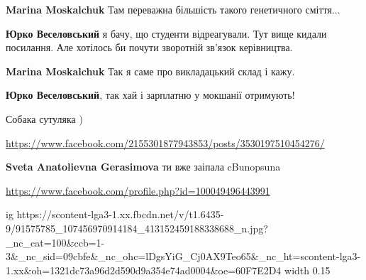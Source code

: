 \begin{itemize}

\textbf{Marina Moskalchuk} Там переважна більшість такого генетичного сміття...


\textbf{Юрко Веселовський} я бачу, що студенти відреагували. Тут вище кидали посилання.
Але хотілось би почути зворотній зв'язок керівництва.


\textbf{Marina Moskalchuk} Так я саме про викладацький склад і кажу.


\textbf{Юрко Веселовський}, так хай і зарплатню у мокшанії отримують!
\end{itemize}


Собака сутуляка )


\url{https://www.facebook.com/2155301877943853/posts/3530197510454276/}

\begin{itemize}

\textbf{Sveta Anatolievna Gerasimova} ти вже заіпала cBunopsuna
\end{itemize}

\url{https://www.facebook.com/profile.php?id=100049496443991}\par
\ifcmt
  ig https://scontent-lga3-1.xx.fbcdn.net/v/t1.6435-9/91575785_107456970914184_413152459188338688_n.jpg?_nc_cat=100&ccb=1-3&_nc_sid=09cbfe&_nc_ohc=lDgsYiG_Cj0AX9Teo65&_nc_ht=scontent-lga3-1.xx&oh=1321dc73a96d2d590d9a354e74ad0004&oe=60F7E2D4
  width 0.15


